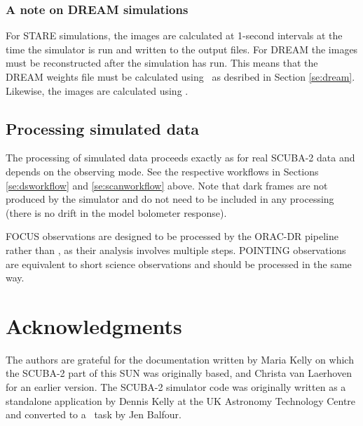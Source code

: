\documentclass[oneside,11pt]{starlink}
\begin{document}
\subsubsection{A note on DREAM simulations\label{se:dreamsim}}

For STARE simulations, the images are calculated at 1-second intervals
at the time the simulator is run and written to the output files. For
DREAM the images must be reconstructed after the simulation has
run. This means that the DREAM weights file must be calculated using
\dreamweights\ as desribed in Section \ref{se:dream}. Likewise, the
images are calculated using \dreamsolve.

\subsection{Processing simulated data\label{se:simdr}}

The processing of simulated data proceeds exactly as for real SCUBA-2
data and depends on the observing mode. See the respective workflows
in Sections \ref{se:dsworkflow} and \ref{se:scanworkflow} above. Note
that dark frames are not produced by the simulator and do not need to
be included in any processing (there is no drift in the model
bolometer response).

FOCUS observations are designed to be processed by the ORAC-DR
pipeline rather than \SMURF, as their analysis involves multiple
steps. POINTING observations are equivalent to short science
observations and should be processed in the same way.

\section{Acknowledgments}

The authors are grateful for the documentation written by Maria Kelly
on which the SCUBA-2 part of this SUN was originally based, and
Christa van Laerhoven for an earlier version. The SCUBA-2 simulator
code was originally written as a standalone application by Dennis
Kelly at the UK Astronomy Technology Centre and converted to a \SMURF\
task by Jen Balfour.

\end{document}
